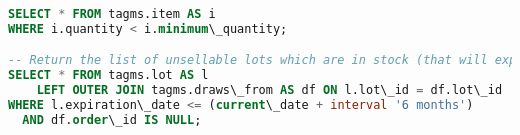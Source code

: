 \begin{lstlisting}[language=SQL,
keywordstyle=\color{blue},
stringstyle=\color{mauve},
showstringspaces=false,
basicstyle=\ttfamily\footnotesize]
SELECT * FROM tagms.item AS i
WHERE i.quantity < i.minimum\_quantity;

-- Return the list of unsellable lots which are in stock (that will expire in less than 6 months)
SELECT * FROM tagms.lot AS l
    LEFT OUTER JOIN tagms.draws\_from AS df ON l.lot\_id = df.lot\_id
WHERE l.expiration\_date <= (current\_date + interval '6 months')
  AND df.order\_id IS NULL;

\end{lstlisting}

